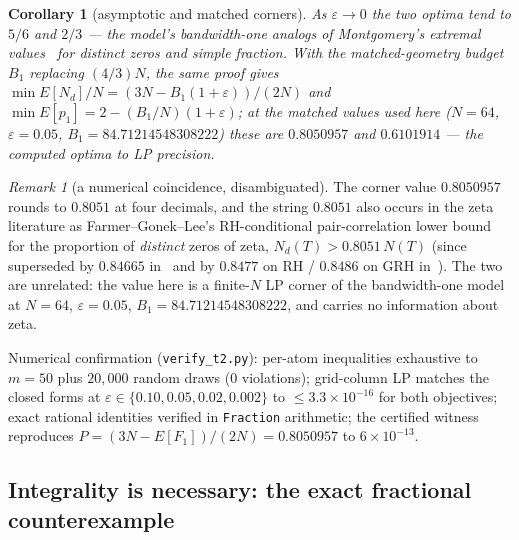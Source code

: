 \documentclass[11pt]{article}
\theoremstyle{plain}
\newtheorem{corollary}[theorem]{Corollary}
\theoremstyle{definition}
\theoremstyle{remark}
\newtheorem*{remk}{Remark}
\newcommand{\Nd}{N_{d}}
\begin{document}
\begin{corollary}[asymptotic and matched corners]
\label{cor:matched}
As $\varepsilon \to 0$ the two optima tend to $5/6$ and $2/3$ --- the model's
bandwidth-one analogs of Montgomery's extremal values~\cite{Mon73} for distinct
zeros and simple fraction. With the matched-geometry budget $B_1$ replacing
$(4/3)N$, the same proof gives
$\min E[\Nd]/N = (3N - B_1(1 + \varepsilon))/(2N)$ and
$\min E[p_1] = 2 - (B_1/N)(1 + \varepsilon)$; at the matched values used here
($N = 64$, $\varepsilon = 0.05$, $B_1 = 84.71214548308222$) these are
$0.8050957$ and $0.6101914$ --- the computed optima to LP
precision.
\end{corollary}

\begin{remk}[a numerical coincidence, disambiguated]
The corner value $0.8050957$ rounds to $0.8051$ at four decimals, and the string
$0.8051$ also occurs in the zeta literature as Farmer--Gonek--Lee's RH-conditional
pair-correlation lower bound for the proportion of \emph{distinct} zeros of
zeta,
$\Nd(T) > 0.8051\,N(T)$ \cite[Cor.~1.4]{FGL14} (since superseded by $0.84665$
in~\cite{BHB13} and by $0.8477$ on RH / $0.8486$ on GRH
in~\cite[Cor.~3]{CGdL20}). The two are unrelated: the value here is a
finite-$N$ LP
corner of the bandwidth-one model at $N = 64$, $\varepsilon = 0.05$,
$B_1 = 84.71214548308222$, and carries no information about zeta.
\end{remk}

Numerical confirmation (\texttt{verify\_t2.py}): per-atom inequalities exhaustive
to $m = 50$ plus $20{,}000$ random draws ($0$ violations); grid-column LP matches
the closed forms at $\varepsilon \in \{0.10, 0.05, 0.02, 0.002\}$ to
$\le 3.3 \times 10^{-16}$ for both objectives; exact rational identities verified
in \texttt{Fraction} arithmetic; the certified witness reproduces
$P = (3N - E[F_1])/(2N) = 0.8050957$ to $6 \times 10^{-13}$.

\subsection{Integrality is necessary: the exact fractional counterexample}
\label{sec:fractional}
\end{document}
